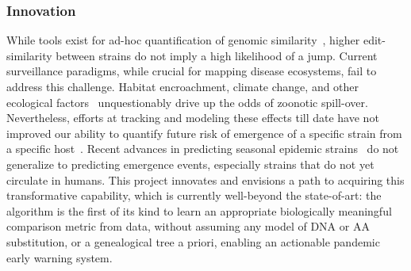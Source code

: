 \documentclass[onecolumn, compsoc,12pt]{IEEEtran}
\begin{document}
\subsubsection*{Innovation} %

While  tools exist for ad-hoc quantification of genomic similarity~\cite{posada1998modeltest,goldberger2005genomic,huelsenbeck1997phylogeny,neher2014predicting,VanderMeer2010,Smith2009}, higher edit-similarity between strains do not imply a high likelihood of a jump.
Current surveillance paradigms, while crucial for mapping  disease ecosystems,  fail  to address this challenge. Habitat encroachment, climate change, and other  ecological factors~\cite{rulli2017nexus,chua2002anthropogenic,childs2004zoonotic} unquestionably  drive up the odds of zoonotic spill-over. Nevertheless, efforts at tracking and modeling these effects till date have not improved our ability to quantify future  risk of emergence of a specific strain from a specific host~\cite{fair2019viral}. Recent advances in predicting seasonal epidemic strains~\cite{huddleston2020integrating} do not generalize to predicting emergence events, especially strains that do not yet circulate in humans. This project innovates and envisions a path to acquiring this transformative capability, which is currently well-beyond the state-of-art: the \enet algorithm is  the first of its kind to learn an appropriate biologically meaningful comparison metric from data, without assuming any model of DNA or AA substitution, or a genealogical tree a priori, enabling an actionable pandemic early warning system.


\clearpage
{}


 



\clearpage

\end{document}
